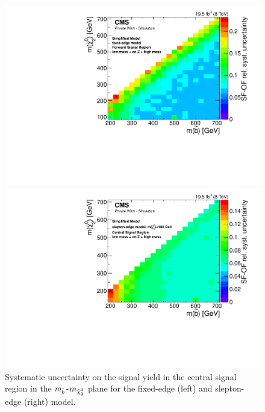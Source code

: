 \begin{figure}[t]
\centering
\begin{minipage}[t]{0.49\textwidth}
  \includegraphics[width=\textwidth]{plots/limits/T6bblledge_70_GeV_Edge_Endcap_syst_err.pdf}
\end{minipage}
\begin{minipage}[t]{0.49\textwidth}
\includegraphics[width=\textwidth]{plots/limits/T6bbllslepton_m_n_1_100_Barrel_syst_err_Reweighted.pdf}
\end{minipage}
\caption{Systematic uncertainty on the signal yield in the central signal region in the $m_{\tilde{b}}$-$m_{{\tilde{\chi}^0_2}}$ plane for the fixed-edge (left) and slepton-edge (right) model.}
\label{fig:sys}
\end{figure}
